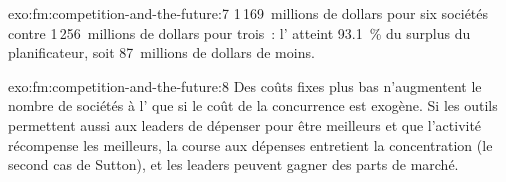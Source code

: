 \begin{solution}{exo:fm:competition-and-the-future:7}
1\,169~millions de dollars pour six sociétés contre 1\,256~millions de dollars pour trois~: l' atteint 93.1~\% du surplus du planificateur, soit 87~millions de dollars de moins.
\end{solution}

\begin{solution}{exo:fm:competition-and-the-future:8}
Des coûts fixes plus bas n'augmentent le nombre de sociétés à l' que si le coût de la concurrence est exogène. Si les outils permettent aussi aux leaders de dépenser pour être meilleurs et
que l'activité récompense les meilleurs, la course aux dépenses entretient la concentration (le second cas de Sutton), et les leaders peuvent gagner des parts de marché.
\end{solution}

